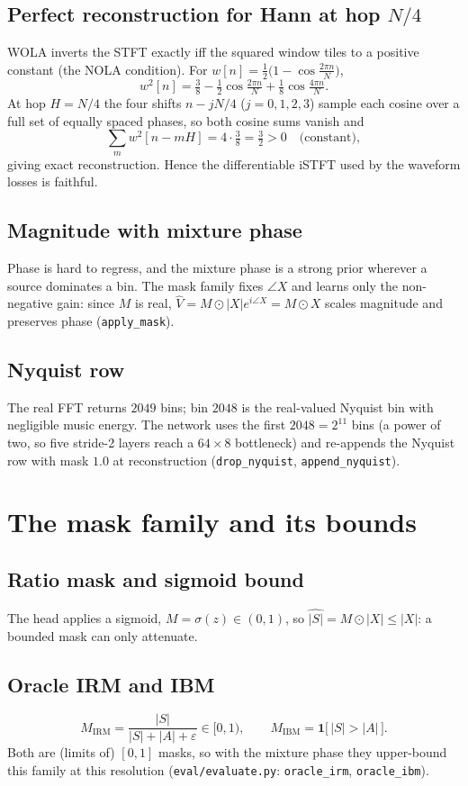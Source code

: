 \documentclass[11pt]{article}
\newcommand{\code}[1]{\texttt{#1}}
\begin{document}
\subsection{Perfect reconstruction for Hann at hop $N/4$}
WOLA inverts the STFT exactly iff the squared window tiles to a positive
constant (the NOLA condition). For $w[n]=\tfrac12\bigl(1-\cos\tfrac{2\pi n}{N}\bigr)$,
\[
w^2[n]=\tfrac38-\tfrac12\cos\tfrac{2\pi n}{N}+\tfrac18\cos\tfrac{4\pi n}{N}.
\]
At hop $H=N/4$ the four shifts $n-jN/4$ ($j=0,1,2,3$) sample each cosine over a
full set of equally spaced phases, so both cosine sums vanish and
\[
\sum_m w^2[n-mH]=4\cdot\tfrac38=\tfrac32>0 \quad\text{(constant)},
\]
giving exact reconstruction. Hence the differentiable iSTFT used by the waveform
losses is faithful.

\subsection{Magnitude with mixture phase}
Phase is hard to regress, and the mixture phase is a strong prior wherever a
source dominates a bin. The mask family fixes $\angle X$ and learns only the
non-negative gain: since $M$ is real,
$\widehat V=M\odot|X|e^{i\angle X}=M\odot X$ scales magnitude and preserves phase
(\code{apply\_mask}).

\subsection{Nyquist row}
The real FFT returns $2049$ bins; bin $2048$ is the real-valued Nyquist bin with
negligible music energy. The network uses the first $2048=2^{11}$ bins (a power
of two, so five stride-2 layers reach a $64\times8$ bottleneck) and re-appends
the Nyquist row with mask $1.0$ at reconstruction (\code{drop\_nyquist},
\code{append\_nyquist}).

\section{The mask family and its bounds}

\subsection{Ratio mask and sigmoid bound}
The head applies a sigmoid, $M=\sigma(z)\in(0,1)$, so
$\widehat{|S|}=M\odot|X|\le|X|$: a bounded mask can only attenuate.

\subsection{Oracle IRM and IBM}
\[
M_{\mathrm{IRM}}=\frac{|S|}{|S|+|A|+\varepsilon}\in[0,1),\qquad
M_{\mathrm{IBM}}=\mathbf 1\bigl[\,|S|>|A|\,\bigr].
\]
Both are (limits of) $[0,1]$ masks, so with the mixture phase they upper-bound
this family at this resolution (\code{eval/evaluate.py}: \code{oracle\_irm},
\code{oracle\_ibm}).
\end{document}
